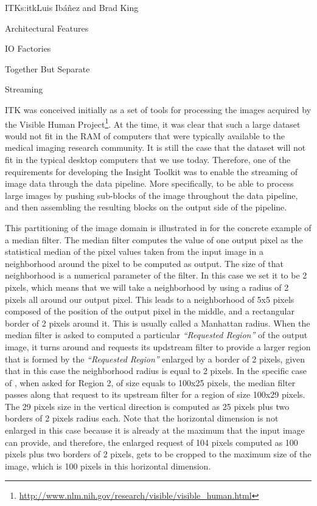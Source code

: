 \begin{aosachapter}{ITK}{s:itk}{Luis Ib\'{a}\~{n}ez and Brad King}
\begin{aosasect1}{Architectural Features}
\begin{aosasect2}{IO Factories}
\begin{aosasect3}{Together But Separate}
\end{aosasect3}

\end{aosasect2}

\begin{aosasect2}{Streaming}\label{sec.itk.streaming}

ITK was conceived initially as a set of tools for processing the images
acquired by the Visible Human
Project\footnote{\url{http://www.nlm.nih.gov/research/visible/visible_human.html}}.
At the time, it was clear that such a large dataset would not fit in the RAM of
computers that were typically available to the medical imaging research
community. It is still the case that the dataset will not fit in the typical
desktop computers that we use today. Therefore, one of the requirements for
developing the Insight Toolkit was to enable the streaming of image data
through the data pipeline. More specifically, to be able to process large
images by pushing sub-blocks of the image throughout the data pipeline, and then
assembling the resulting blocks on the output side of the pipeline.


This partitioning of the image domain is illustrated in
 for the concrete example of a median filter. The
median filter computes the value of one output pixel as the statistical median
of the pixel values taken from the input image in a neighborhood around the
pixel to be computed as output. The size of that neighborhood is a numerical
parameter of the filter. In this case we set it to be 2 pixels, which means
that we will take a neighborhood by using a radius of 2 pixels all around our
output pixel. This leads to a neighborhood of 5x5 pixels composed of the
position of the output pixel in the middle, and a rectangular border of 2
pixels around it. This is usually called a Manhattan radius. When the median
filter is asked to computed a particular \emph{``Requested Region''} of the
output image, it turns around and requests its updstream filter to provide a
larger region that is formed by the \emph{``Requested Region''} enlarged by a
border of 2 pixels, given that in this case the neighborhood radius is equal to
2 pixels. In the specific case of , when asked
for Region 2, of size equals to 100x25 pixels, the median filter passes along
that request to its upstream filter for a region of size 100x29 pixels. The 29
pixels size in the vertical direction is computed as 25 pixels plus two borders
of 2 pixels radius each. Note that the horizontal dimension is not enlarged in
this case because it is already at the maximum that the input image can
provide, and therefore, the enlarged request of 104 pixels computed as 100
pixels plus two borders of 2 pixels, gets to be cropped to the maximum size of
the image, which is 100 pixels in this horizontal dimension.


\end{aosasect2}
\end{aosasect1}
\end{aosachapter}
